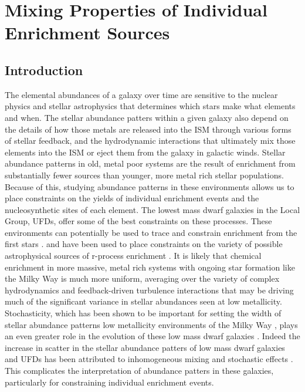 \chapter[Mixing Properties of Individual Enrichment Sources]{Mixing Properties of Individual Enrichment Sources\label{ch:chapter4}}
\begingroup
\let\thefootnote\relax{}
\endgroup

%
%

\newcommand{\runone}{I\_}
\newcommand{\runonenu}{I}
\newcommand{\runtwo}{II\_}
\newcommand{\runtwonu}{II}

\section{Introduction}

The elemental abundances of a galaxy over time are sensitive to the nuclear physics and stellar astrophysics that determines which stars make what elements and when. The stellar abundance patters within a given galaxy also depend on the details of how those metals are released into the ISM through various forms of stellar feedback, and the hydrodynamic interactions that ultimately mix those elements into the ISM or eject them from the galaxy in galactic winds. Stellar abundance patterns in old, metal poor systems are the result of enrichment from substantially fewer sources than younger, more metal rich stellar populations. Because of this, studying abundance patterns in these environments allows us to place constraints on the yields of individual enrichment events and the nucleosynthetic sites of each element. The lowest mass dwarf galaxies in the Local Group, UFDs, offer some of the best constraints on these processes. These environments can potentially be used to trace and constrain enrichment from the first stars \citep[e.g.][]{FrebelBromm2012,Ji2015,Ritter2015,Jeon2017,Hartwig2018}. and have been used to place constraints on the variety of possible astrophysical sources of r-process enrichment \citep[e.g.][]{Ji2016a,Ji2016b,Ji2018a,Ji2019,Tsujimoto2017,Duggan2018,Nagasawa2018,Ojima2018}. It is likely that chemical enrichment in more massive, metal rich systems with ongoing star formation like the Milky Way is much more uniform, averaging over the variety of complex hydrodynamics and feedback-driven turbulence interactions that may be driving much of the significant variance in stellar abundances seen at low metallicity. Stochasticity, which has been shown to be important for setting the width of stellar abundance patterns low metallicity environments of the Milky Way \citep[e.g.][]{Cescutti2008,Cescutti2014}, plays an even greater role in the evolution of these low mass dwarf galaxies \citep{Applebaum2018}. Indeed the increase in scatter in the stellar abundance patters of low mass dwarf galaxies and UFDs has been attributed to inhomogeneous mixing and stochastic effects \citep[e.g.][]{Norris2010a,Simon2015,Mashonkina2017,Suda2017}. This complicates the interpretation of abundance patters in these galaxies, particularly for constraining individual enrichment events.

